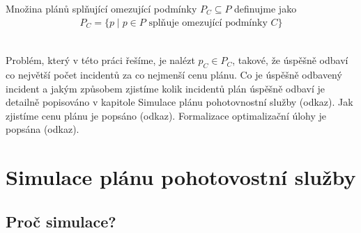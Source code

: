 \begin{definice}
  Množina plánů splňující omezující podmínky $P_C \subseteq P$ definujme jako
  \begin{align}
    P_C = \{ p \mid \text{$p \in P$ splňuje omezující podmínky $C$} \}
  \end{align}
  \\
\end{definice}

Problém, který v této práci řešíme, je nalézt $p_C \in P_C$, takové, že úspěšně odbaví co největší počet incidentů za co nejmenší cenu plánu.
Co je úspěšně odbavený incident a jakým způsobem zjistíme kolik incidentů plán úspěšně odbaví je detailně popisováno v kapitole Simulace plánu pohotovnostní služby (odkaz).
Jak zjistíme cenu plánu je popsáno (odkaz).
Formalizace optimalizační úlohy je popsána (odkaz).

\section{Simulace plánu pohotovostní služby}

\subsection{Proč simulace?}

